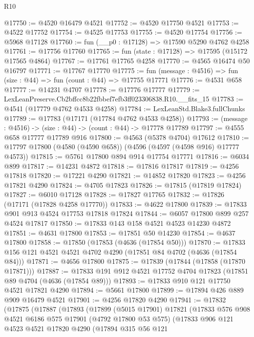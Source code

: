 \begin{lexlean}{R10}
\begin{coremodule}
@17750 := @4520 @16479 @4521
@17752 := @4520 @17750 @4521
@17753 := @4522 @17752
@17754 := @4525 @17753
@17755 := @4520 @17754
@17756 := @5968 @17128
@17760 := fun (__p0 : @17128) => @17590 @5290 @4762 @4258
@17761 := @17756 @17760
@17765 := fun (state : @17128) => @17595 (@15172 @17565 @4864)
@17767 := @17761 @17765 @4258
@17770 := @4565 @16474 @50 @16797
@17771 := @17767 @17770
@17775 := fun (message : @4516) => fun (size : @44) => fun (count : @44) => @17755 @17771
@17776 := @4531 @658
@17777 := @14231 @4707
@17778 := @17776 @17777
@17779 := LexLeanPreserve.Cb2bffcc8b22fbbef7efb3ff023306838.R10.__fits_15
@17783 := @4541 (@17779 @4762 @4533 @4258)
@17784 := LexLeanStd.Blake3.fullChunks
@17789 := @17783 (@17171 (@17784 @4762 @4533 @4258))
@17793 := (message : @4516) -> (size : @44) -> (count : @44) -> @17778 @17789
@17797 := @4555 @658 @17777 @17789 @916
@17800 := @4563 (@5378 @4704) @17612
@17810 := @17797 @17800 (@4580 (@4590 @658)) (@4596 (@4597 (@4598 @916) @17777 @4573))
@17815 := @5761 @17800 @894 @914 @17754 @17771
@17816 := @6034 @899
@17817 := @14231 @4872
@17818 := @17816 @17817
@17819 := @4256 @17818
@17820 := @17221 @4290
@17821 := @14852 @17820
@17823 := @4256 @17821 @4290
@17824 := @4705 @17823
@17826 := @17815 (@17819 @17824)
@17827 := @6010 @17128
@17828 := @17827 @17765
@17832 := @17826 (@17171 (@17828 @4258 @17770))
@17833 := @4622 @17800
@17839 := @17833 @901 @913 @4524 @17753 @17818 @17824
@17844 := @6057 @17800 @899 @257 @4524 @17817
@17850 := @17833 @143 @158 @4521 @4523 @14230 @4872
@17851 := @4631 @17800
@17853 := @17851 @50 @14230
@17854 := @4637 @17800
@17858 := @17850 (@17853 (@4636 (@17854 @50)))
@17870 := @17833 @156 @121 @4521 @4521 @4702 @4290 (@17851 @84 @4702 (@4636 (@17854 @84)))
@17871 := @4656 @17800
@17875 := @17839 (@17844 (@17858 (@17870 @17871)))
@17887 := @17833 @191 @912 @4521 @17752 @4704 @17823 (@17851 @89 @4704 (@4636 (@17854 @89)))
@17893 := @17833 @910 @121 @17750 @4521 @17821 @4290
@17894 := @5661 @17800
@17899 := @17894 @426 @889 @909 @16479 @4521
@17901 := @4256 @17820 @4290
@17941 := @17832
    (@17875
      (@17887
        (@17893
          (@17899
            (@5015 @17901)
            @17821
            (@17833
              @576
              @908
              @4521
              @6186
              @575
              @17901
              (@4792 @17800 @53 @575)
              (@17833
                @906
                @121
                @4523
                @4521
                @17820
                @4290
                (@17894
                  @315
                  @56
                  @121

\end{coremodule}
\end{lexlean}
